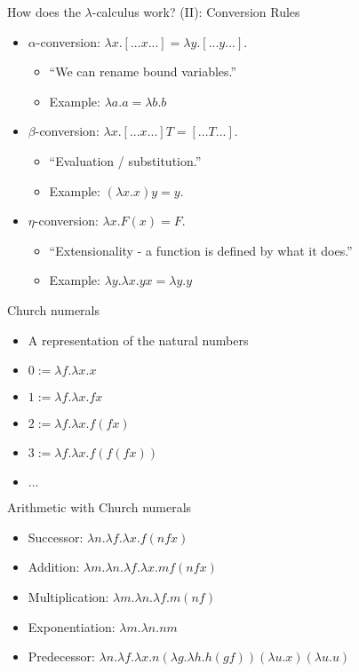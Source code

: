 \documentclass{beamer}
\begin{document}
\begin{frame}{How does the $\lambda$-calculus work? (II): Conversion Rules}
\begin{itemize}
\item $\alpha$-conversion: $\lambda x.[...x...] = \lambda y.[...y...]$.  
  \begin{itemize}
  \item ``We can rename bound variables.''
  \item Example: $\lambda a.a = \lambda b.b$
  \end{itemize}
\item $\beta$-conversion: $\lambda x.[...x...] T = [...T...]$. 
  \begin{itemize}
    \item ``Evaluation / substitution.''
    \item Example: $(\lambda x.x)y = y.$
  \end{itemize}
\item $\eta$-conversion: $\lambda x.F(x) = F$. 
  \begin{itemize}
    \item ``Extensionality - a function is defined by what it does.''
    \item Example: $\lambda y.\lambda x.yx =\lambda y.y$
  \end{itemize}
\end{itemize}
\end{frame}

\begin{frame}{Church numerals}
\begin{itemize}
\item A representation of the natural numbers
\item $0 := \lambda f.\lambda x.x$
\item $1 := \lambda f.\lambda x.f x$
\item $2 := \lambda f.\lambda x.f (f x)$
\item $3 := \lambda f.\lambda x.f (f (f x))$
\item $\ldots$
\end{itemize}
\end{frame}

\begin{frame}{Arithmetic with Church numerals}
\begin{itemize}
\item Successor: $\lambda n.\lambda f.\lambda x. f (n f x)$
\item Addition: $\lambda m.\lambda n.\lambda f.\lambda x. m f (n f x)$
\item Multiplication: $\lambda m.\lambda n.\lambda f. m (n f)$
\item Exponentiation: $\lambda m.\lambda n. n m$
\item Predecessor: $\lambda n.\lambda f.\lambda x. n (\lambda g.\lambda h. h (g f)) (\lambda u. x) (\lambda u. u)$
\end{itemize}
\end{frame}
\end{document}
